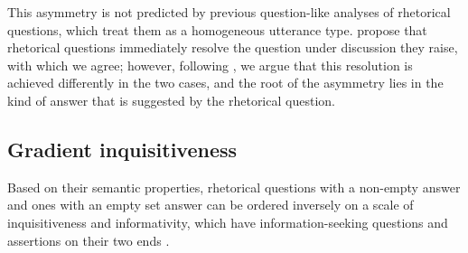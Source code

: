 \documentclass[output=paper,colorlinks,citecolor=brown            ,chinesefont]{langscibook}
\begin{document}
This asymmetry is not predicted by previous question-like analyses of rhetorical questions, which treat them as a homogeneous utterance type. \citet{Biezma+2017} propose that rhetorical questions immediately resolve the question under discussion they raise, with which we agree; however, following \citet{Jamieson2018phd}, we argue that this resolution is achieved differently in the two cases, and the root of the asymmetry lies in the kind of answer that is suggested by the rhetorical question. 

\subsection{Gradient inquisitiveness}
\largerpage[2]
\label{subsec:gradient}

Based on their semantic properties, rhetorical questions with a non-empty answer and ones with an empty set answer can be ordered inversely on a scale of inquisitiveness and informativity, which have information-seeking questions and assertions on their two ends \citep{Kiss+2021}.

\begin{table}
\caption{Inquisitiveness and informativity of assertions, rhetorical and information-seeking questions}
\label{tab:gradience}
\end{table}
\end{document}
